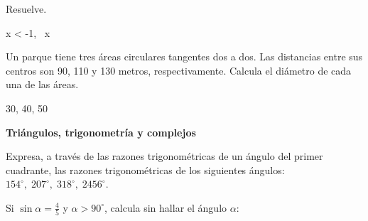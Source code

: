 \documentclass[12pt]{exam}
\begin{document}
\begin{questions}
\question Resuelve.
\begin{solution}
x < -1, \, x 
\end{solution}

\question Un parque tiene tres áreas circulares tangentes dos a dos. Las distancias entre sus centros son 90, 110 y 130 metros, respectivamente. Calcula el diámetro de cada una de las áreas.
\begin{solution}
 30, 40, 50 
\end{solution}



\textbf{Triángulos, trigonometría y complejos}

\question Expresa, a través de las razones trigonométricas de un ángulo del primer cuadrante, las razones trigonométricas de los siguientes ángulos:  
\( 154^\circ, \; 207^\circ, \; 318^\circ, \; 2456^\circ \).

\question Si \( \sin \alpha = \frac{4}{5} \) y \( \alpha > 90^\circ \), calcula sin hallar el ángulo \( \alpha \):  
\end{questions}
\end{document}
